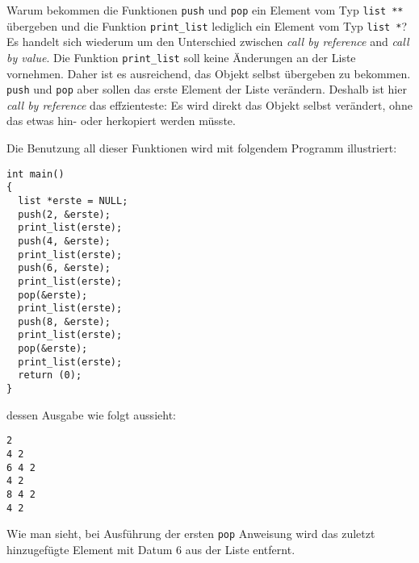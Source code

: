 Warum bekommen die Funktionen \verb|push| und \verb|pop| ein Element vom Typ \verb|list **| übergeben und die Funktion \verb|print_list| lediglich ein Element vom Typ \verb|list *|?
Es handelt sich wiederum um den Unterschied zwischen \emph{call by reference} and \emph{call by value}.
Die Funktion \verb|print_list| soll keine Änderungen an der Liste vornehmen.
Daher ist es ausreichend, das Objekt selbst übergeben zu bekommen.
\verb|push| und \verb|pop| aber sollen das erste Element der Liste verändern.
Deshalb ist hier \emph{call by reference} das effzienteste: Es wird direkt das Objekt selbst verändert, ohne das etwas hin- oder herkopiert werden müsste.

Die Benutzung all dieser Funktionen wird mit folgendem Programm illustriert:
\begin{lstlisting}
int main()
{
  list *erste = NULL;
  push(2, &erste);
  print_list(erste);
  push(4, &erste);
  print_list(erste);
  push(6, &erste);
  print_list(erste);
  pop(&erste);
  print_list(erste);
  push(8, &erste);
  print_list(erste);
  pop(&erste);
  print_list(erste);
  return (0);
}
\end{lstlisting}
dessen Ausgabe wie folgt aussieht:
\begin{verbatim}
2	
4 2
6 4 2	
4 2
8 4 2	
4 2
\end{verbatim}
Wie man sieht, bei Ausführung der ersten \texttt{pop} Anweisung wird das zuletzt hinzugefügte Element mit Datum $6$ aus der Liste entfernt.

\endinput

